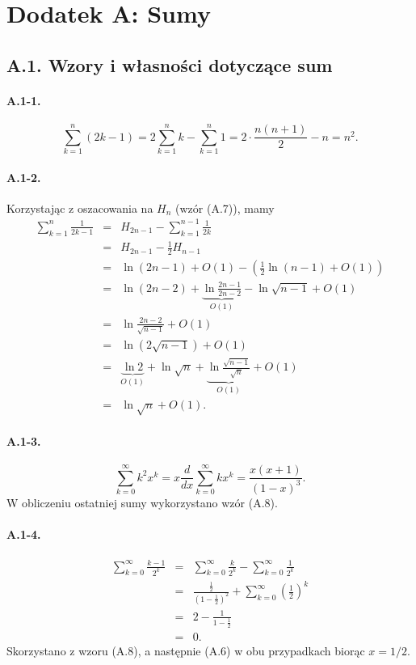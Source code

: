 \section*{Dodatek A: Sumy}

\subsection*{A.1. Wzory i własności dotyczące sum}

\paragraph{A.1-1.}
\[
	\sum_{k=1}^n(2k-1) = 2\sum_{k=1}^nk-\sum_{k=1}^n1 = 2\cdot\frac{n(n+1)}{2}-n = n^2.
\]

\paragraph{A.1-2.}
Korzystając z oszacowania na $H_n$ (wzór (A.7)), mamy
\begin{eqnarray*}
	\sum_{k=1}^n\frac{1}{2k-1} &=& H_{2n-1}-\sum_{k=1}^{n-1}\frac{1}{2k} \\
	&=& H_{2n-1}-\frac{1}{2}H_{n-1} \\
	&=& \ln (2n-1)+O(1)-\left(\frac{1}{2}\ln(n-1)+O(1)\right) \\
	&=& \ln (2n-2)+\underbrace{\ln\frac{2n-1}{2n-2}}_{O(1)}-\ln\sqrt{n-1}+O(1) \\
	&=& \ln\frac{2n-2}{\sqrt{n-1}}+O(1) \\
	&=& \ln\left(2\sqrt{n-1}\right)+O(1) \\
	&=& \underbrace{\ln 2}_{O(1)}+\ln\sqrt{n}+\underbrace{\ln\frac{\sqrt{n-1}}{\sqrt{n}}}_{O(1)}+O(1) \\
	&=& \ln\sqrt{n}+O(1).
\end{eqnarray*}

\paragraph{A.1-3.}
\[
	\sum_{k=0}^\infty k^2x^k = x\frac{d}{dx}\sum_{k=0}^\infty kx^k = \frac{x(x+1)}{(1-x)^3}.
\]
W obliczeniu ostatniej sumy wykorzystano wzór (A.8).

\paragraph{A.1-4.}
\begin{eqnarray*}
	\sum_{k=0}^\infty\frac{k-1}{2^k} &=& \sum_{k=0}^\infty\frac{k}{2^k}-\sum_{k=0}^\infty\frac{1}{2^k} \\
	&=& \frac{\frac{1}{2}}{\left(1-\frac{1}{2}\right)^2}+\sum_{k=0}^\infty\left(\frac{1}{2}\right)^k \\
	&=& 2-\frac{1}{1-\frac{1}{2}} \\
	&=& 0.
\end{eqnarray*}
Skorzystano z wzoru (A.8), a następnie (A.6) w obu przypadkach biorąc $x=1/2$.

